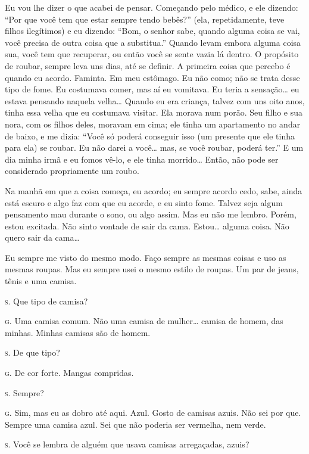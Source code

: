 Eu vou lhe dizer o que acabei de pensar. Começando pelo médico, e
ele dizendo: ``Por que você tem que estar sempre tendo
bebês?'' (ela, repetidamente, teve filhos ilegítimos) e eu
dizendo: ``Bom, o senhor sabe, quando alguma coisa se vai,
você precisa de outra coisa que a substitua.'' Quando
levam embora alguma coisa sua, você tem que recuperar, ou então você se
sente vazia lá dentro. O propósito de roubar, sempre leva uns dias, até
se definir. A primeira coisa que percebo é quando eu acordo. Faminta.
Em meu estômago. Eu não como; não se trata desse tipo de fome. Eu
costumava comer, mas aí eu vomitava. Eu teria a sensação\ldots{} eu estava
pensando naquela velha\ldots{} Quando eu era criança, talvez com uns oito
anos, tinha essa velha que eu costumava visitar. Ela morava num porão.
Seu filho e sua nora, com os filhos deles, moravam em cima; ele tinha
um apartamento no andar de baixo, e me dizia: ``Você só
poderá conseguir isso (um presente que ele tinha para ela) se roubar.
Eu não darei a você\ldots{} mas, se você roubar, poderá ter.''
E um dia minha irmã e eu fomos vê-lo, e ele tinha morrido\ldots{} Então, não
pode ser considerado propriamente um roubo.

Na manhã em que a coisa começa, eu acordo; eu sempre acordo cedo,
sabe, ainda está escuro e algo faz com que eu acorde, e eu sinto fome.
Talvez seja algum pensamento mau durante o sono, ou algo assim. Mas eu
não me lembro. Porém, estou excitada. Não sinto vontade de sair da
cama. Estou\ldots{} alguma coisa. Não quero sair da cama\ldots{}

Eu sempre me visto do mesmo modo. Faço sempre as mesmas coisas e uso
as mesmas roupas. Mas eu sempre usei o mesmo estilo de roupas. Um par
de jeans, tênis e uma camisa.

\noindent\hskip0mm\textsc{s.} Que tipo de camisa?

\noindent\hskip0mm\textsc{g.} Uma camisa comum. Não uma camisa de mulher\ldots{} camisa de homem, das
minhas. Minhas camisas são de homem.

\noindent\hskip0mm\textsc{s.} De que tipo?

\noindent\hskip0mm\textsc{g.} De cor forte. Mangas compridas.

\noindent\hskip0mm\textsc{s.} Sempre?

\noindent\hskip0mm\textsc{g.} Sim, mas eu as dobro até aqui. Azul. Gosto de camisas azuis. Não sei
por que. Sempre uma camisa azul. Sei que não poderia ser vermelha, nem
verde.

\noindent\hskip0mm\textsc{s.} Você se lembra de alguém que usava camisas arregaçadas, azuis?


